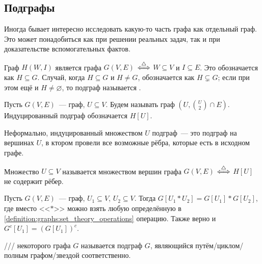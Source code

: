 \subsection{Подграфы}
\label{subsec:graphs:subgraphs}

Иногда бывает интересно исследовать какую-то часть графа как отдельный граф.
Это может понадобиться как при решении реальных задач, так и при доказательстве вспомогательных фактов.

\begin{definition}
    \label{definition:graphs:subgraph}
    Граф $ H(W, I) $ является  графа $ G(V, E) $ $ \overset{\triangle}{\Longleftrightarrow} $ $ W \subseteq V $ и $ I \subseteq E $.
    Это обозначается как $ H \subseteq G $.
    Случай, когда $ H \subseteq G $ и $ H \neq G $, обозначается как $ H \varsubsetneq G $;
    если при этом ещё и $ H \neq \varnothing $, то подграф называется .
\end{definition}

\begin{definition}
    Пусть $ G(V, E) $~--- граф, $ U \subseteq V $.
    Будем называть  граф $ \left( U, \binom{U}{2} \cap E \right) $.
    Индуцированный подграф обозначается $ H[U] $.
\end{definition}

Неформально, индуцированный множеством $ U $ подграф~--- это подграф на вершинах $ U $, в ктором провели все возможные рёбра, которые есть в исходном графе.

\begin{definition}
    Множество $ U \subseteq V $ называется  множеством вершин графа $ G(V, E) $ $ \overset{\triangle}{\Longleftrightarrow} $ $ H[U] $ не содержит рёбер.
\end{definition}

\begin{statement}
    \label{statement:graphs:subgraph_set_theory_operations}
    Пусть $ G(V, E) $~--- граф, $ U_1 \subseteq V $, $ U_2 \subseteq V $.
    Тогда $ G[U_1 * U_2] = G[U_1] * G[U_2] $, где вместо <<$ * $>> можно взять любую определённую в \ref{definition:graphs:set_theory_operations} операцию.
    Также верно и $ G^c[U_1] = (G[U_1])^c $.
\end{statement}

\begin{definition}
    /// некоторого графа $ G $ называется подграф $ G $,
    являющийся путём/циклом/полным графом/звездой соответственно.
\end{definition}

